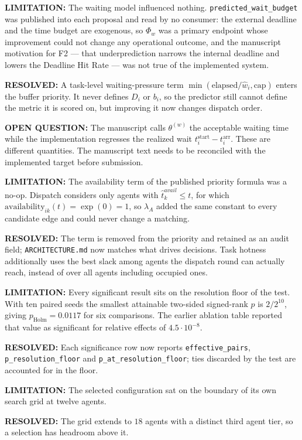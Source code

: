 \documentclass[11pt]{article}
\newcommand{\Question}[1]{\par\noindent\textcolor{question}{\textbf{OPEN QUESTION:} #1}\par}
\newcommand{\Warning}[1]{\par\noindent\textcolor{warning}{\textbf{LIMITATION:} #1}\par}
\newcommand{\Resolved}[1]{\par\noindent\textcolor{confirmed}{\textbf{RESOLVED:} #1}\par}
\begin{document}
\Warning{The waiting model influenced nothing. \texttt{predicted\_wait\_budget}
was published into each proposal and read by no consumer: the external deadline
and the time budget are exogenous, so $\Phi_w$ was a primary endpoint whose
improvement could not change any operational outcome, and the manuscript
motivation for F2 --- that underprediction narrows the internal deadline and
lowers the Deadline Hit Rate --- was not true of the implemented system.}

\Resolved{A task-level waiting-pressure term $\min(\text{elapsed}/\hat w_i,
\text{cap})$ enters the buffer priority. It never defines $D_i$ or $b_i$, so
the predictor still cannot define the metric it is scored on, but improving it
now changes dispatch order.}

\Question{The manuscript calls $\theta^{(w)}$ the acceptable waiting time
while the implementation regresses the realized wait
$t^{\mathrm{start}}_i-t^{\mathrm{arr}}_i$. These are different quantities. The
manuscript text needs to be reconciled with the implemented target before
submission.}

\Warning{The availability term of the published priority formula was a no-op.
Dispatch considers only agents with $\hat t_k^{avail}\le t$, for which
$\mathrm{availability}_{ik}(t)=\exp(0)=1$, so $\lambda_A$ added the same
constant to every candidate edge and could never change a matching.}

\Resolved{The term is removed from the priority and retained as an audit
field; \texttt{ARCHITECTURE.md} now matches what drives decisions. Task
hotness additionally uses the best slack among agents the dispatch round can
actually reach, instead of over all agents including occupied ones.}

\Warning{Every significant result sits on the resolution floor of the test.
With ten paired seeds the smallest attainable two-sided signed-rank $p$ is
$2/2^{10}$, giving $p_{\mathrm{Holm}}=0.0117$ for six comparisons. The earlier
ablation table reported that value as significant for relative effects of
$4.5\cdot 10^{-8}$.}

\Resolved{Each significance row now reports \texttt{effective\_pairs},
\texttt{p\_resolution\_floor} and \texttt{p\_at\_resolution\_floor}; ties
discarded by the test are accounted for in the floor.}

\Warning{The selected configuration sat on the boundary of its own search
grid at twelve agents.}

\Resolved{The grid extends to $18$ agents with a distinct third agent tier, so
a selection has headroom above it.}
\end{document}
